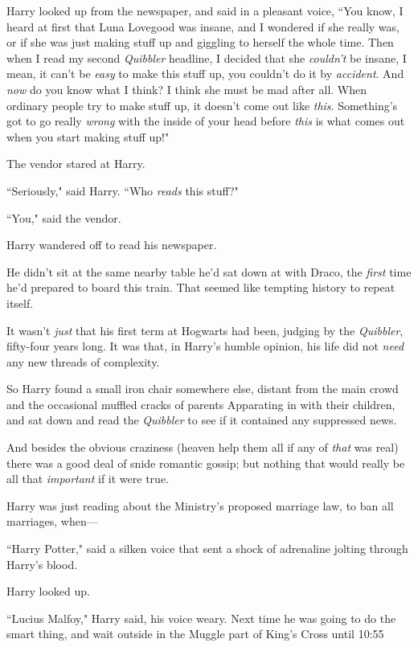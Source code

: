 Harry looked up from the newspaper, and said in a pleasant voice, ``You know, I heard at first that Luna Lovegood was insane, and I wondered if she really was, or if she was just making stuff up and giggling to herself the whole time. Then when I read my second \emph{Quibbler} headline, I decided that she \emph{couldn't} be insane, I mean, it can't be \emph{easy} to make this stuff up, you couldn't do it by \emph{accident}. And \emph{now} do you know what I think? I think she must be mad after all. When ordinary people try to make stuff up, it doesn't come out like \emph{this}. Something's got to go really \emph{wrong} with the inside of your head before \emph{this} is what comes out when you start making stuff up!"

The vendor stared at Harry.

``Seriously," said Harry. ``Who \emph{reads} this stuff?"

``You," said the vendor.

Harry wandered off to read his newspaper.

He didn't sit at the same nearby table he'd sat down at with Draco, the \emph{first} time he'd prepared to board this train. That seemed like tempting history to repeat itself.

It wasn't \emph{just} that his first term at Hogwarts had been, judging by the \emph{Quibbler}, fifty-four years long. It was that, in Harry's humble opinion, his life did not \emph{need} any new threads of complexity.

So Harry found a small iron chair somewhere else, distant from the main crowd and the occasional muffled cracks of parents Apparating in with their children, and sat down and read the \emph{Quibbler} to see if it contained any suppressed news.

And besides the obvious craziness (heaven help them all if any of \emph{that} was real) there was a good deal of snide romantic gossip; but nothing that would really be all that \emph{important} if it were true.

Harry was just reading about the Ministry's proposed marriage law, to ban all marriages, when—

``Harry Potter," said a silken voice that sent a shock of adrenaline jolting through Harry's blood.

Harry looked up.

``Lucius Malfoy," Harry said, his voice weary. Next time he was going to do the smart thing, and wait outside in the Muggle part of King's Cross until 10:55\am

